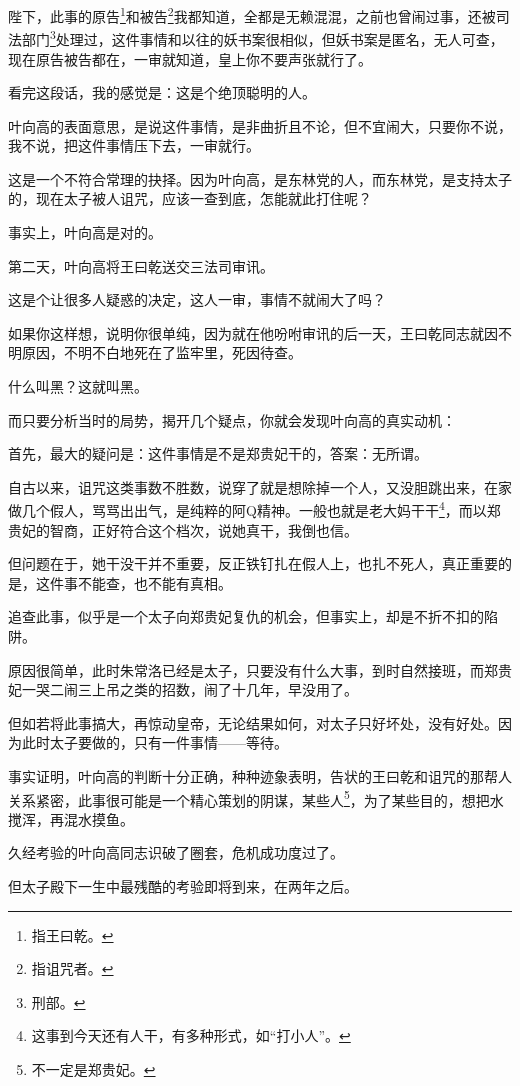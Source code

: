 \begin{multicols}{\theparacolNo}
		陛下，此事的原告\footnote{指王曰乾。}和被告\footnote{指诅咒者。}我都知道，全都是无赖混混，之前也曾闹过事，还被司法部门\footnote{刑部。}处理过，这件事情和以往的妖书案很相似，但妖书案是匿名，无人可查，现在原告被告都在，一审就知道，皇上你不要声张就行了。

		看完这段话，我的感觉是：这是个绝顶聪明的人。

		叶向高的表面意思，是说这件事情，是非曲折且不论，但不宜闹大，只要你不说，我不说，把这件事情压下去，一审就行。

		这是一个不符合常理的抉择。因为叶向高，是东林党的人，而东林党，是支持太子的，现在太子被人诅咒，应该一查到底，怎能就此打住呢？

		事实上，叶向高是对的。

		第二天，叶向高将王曰乾送交三法司审讯。

		这是个让很多人疑惑的决定，这人一审，事情不就闹大了吗？

		如果你这样想，说明你很单纯，因为就在他吩咐审讯的后一天，王曰乾同志就因不明原因，不明不白地死在了监牢里，死因待查。

		什么叫黑？这就叫黑。

		而只要分析当时的局势，揭开几个疑点，你就会发现叶向高的真实动机：

		首先，最大的疑问是：这件事情是不是郑贵妃干的，答案：无所谓。

		自古以来，诅咒这类事数不胜数，说穿了就是想除掉一个人，又没胆跳出来，在家做几个假人，骂骂出出气，是纯粹的阿Q精神。一般也就是老大妈干干\footnote{这事到今天还有人干，有多种形式，如“打小人”。}，而以郑贵妃的智商，正好符合这个档次，说她真干，我倒也信。

		但问题在于，她干没干并不重要，反正铁钉扎在假人上，也扎不死人，真正重要的是，这件事不能查，也不能有真相。

		追查此事，似乎是一个太子向郑贵妃复仇的机会，但事实上，却是不折不扣的陷阱。

		原因很简单，此时朱常洛已经是太子，只要没有什么大事，到时自然接班，而郑贵妃一哭二闹三上吊之类的招数，闹了十几年，早没用了。

		但如若将此事搞大，再惊动皇帝，无论结果如何，对太子只好坏处，没有好处。因为此时太子要做的，只有一件事情——等待。

		事实证明，叶向高的判断十分正确，种种迹象表明，告状的王曰乾和诅咒的那帮人关系紧密，此事很可能是一个精心策划的阴谋，某些人\footnote{不一定是郑贵妃。}，为了某些目的，想把水搅浑，再混水摸鱼。

		久经考验的叶向高同志识破了圈套，危机成功度过了。

		但太子殿下一生中最残酷的考验即将到来，在两年之后。


\end{multicols}
